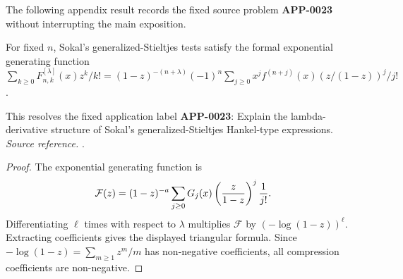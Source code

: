 The following appendix result records the fixed source problem \textbf{APP-0023} \cite{sokal-gs} without interrupting the main exposition.
\begin{proposition}
\label{res:sokal-gs-lambda-derivative-generating-function}
For fixed \(n\), Sokal's generalized-Stieltjes tests satisfy the formal exponential generating function \(\sum_{k\ge0}F^{[\lambda]}_{n,k}(x)z^k/k!=(1-z)^{-(n+\lambda)}(-1)^n\sum_{j\ge0}x^j f^{(n+j)}(x)(z/(1-z))^j/j!\).

This resolves the fixed application label \textbf{APP-0023}: Explain the lambda-derivative structure of Sokal's generalized-Stieltjes Hankel-type expressions.
\emph{Source reference.} \cite{sokal-gs}.
\end{proposition}
\begin{proof}
The exponential generating function is
\[
 \mathcal F(z)
 =(1-z)^{-a}\sum_{j\ge0}G_j(x)
      \left({z\over 1-z}\right)^j{1\over j!}.
\]
Differentiating \(\ell\) times with respect to \(\lambda\) multiplies
\(\mathcal F\) by \((-\log(1-z))^\ell\).  Extracting coefficients gives the
displayed triangular formula.  Since
\(-\log(1-z)=\sum_{m\ge1}z^m/m\) has non-negative coefficients, all compression
coefficients are non-negative.
\end{proof}

